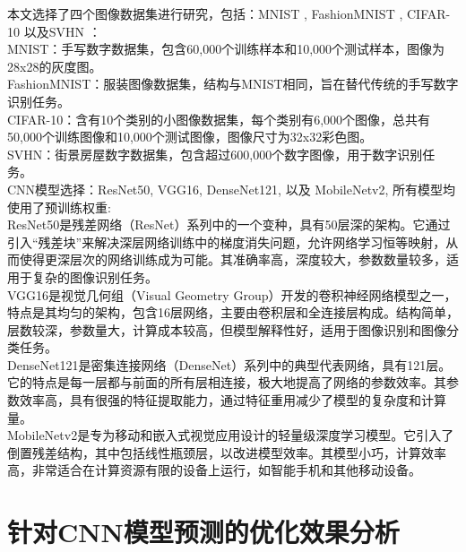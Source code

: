 \documentclass{NauThesis}
\begin{document}
本文选择了四个图像数据集进行研究，包括：MNIST \cite{ref87}, FashionMNIST \cite{ref88}, CIFAR-10 \cite{ref89}以及SVHN \cite{ref90}：
\\\hspace*{2em}MNIST：手写数字数据集，包含60,000个训练样本和10,000个测试样本，图像为28x28的灰度图。
\\\hspace*{2em}FashionMNIST：服装图像数据集，结构与MNIST相同，旨在替代传统的手写数字识别任务。
\\\hspace*{2em}CIFAR-10：含有10个类别的小图像数据集，每个类别有6,000个图像，总共有50,000个训练图像和10,000个测试图像，图像尺寸为32x32彩色图。
\\\hspace*{2em}SVHN：街景房屋数字数据集，包含超过600,000个数字图像，用于数字识别任务。
\\\hspace*{2em}CNN模型选择：ResNet50, VGG16, DenseNet121, 以及 {MobileNetv2}, 所有模型均使用了预训练权重:
\\\hspace*{2em}ResNet50是残差网络（ResNet）系列中的一个变种，具有50层深的架构。它通过引入“残差块”来解决深层网络训练中的梯度消失问题，允许网络学习恒等映射，从而使得更深层次的网络训练成为可能。其准确率高，深度较大，参数数量较多，适用于复杂的图像识别任务。
\\\hspace*{2em}VGG16是视觉几何组（Visual Geometry Group）开发的卷积神经网络模型之一，特点是其均匀的架构，包含16层网络，主要由卷积层和全连接层构成。结构简单，层数较深，参数量大，计算成本较高，但模型解释性好，适用于图像识别和图像分类任务。
\\\hspace*{2em}DenseNet121是密集连接网络（DenseNet）系列中的典型代表网络，具有121层。它的特点是每一层都与前面的所有层相连接，极大地提高了网络的参数效率。其参数效率高，具有很强的特征提取能力，通过特征重用减少了模型的复杂度和计算量。
\\\hspace*{2em}MobileNetv2是专为移动和嵌入式视觉应用设计的轻量级深度学习模型。它引入了倒置残差结构，其中包括线性瓶颈层，以改进模型效率。其模型小巧，计算效率高，非常适合在计算资源有限的设备上运行，如智能手机和其他移动设备。


\section{针对CNN模型预测的优化效果分析}
\end{document}
